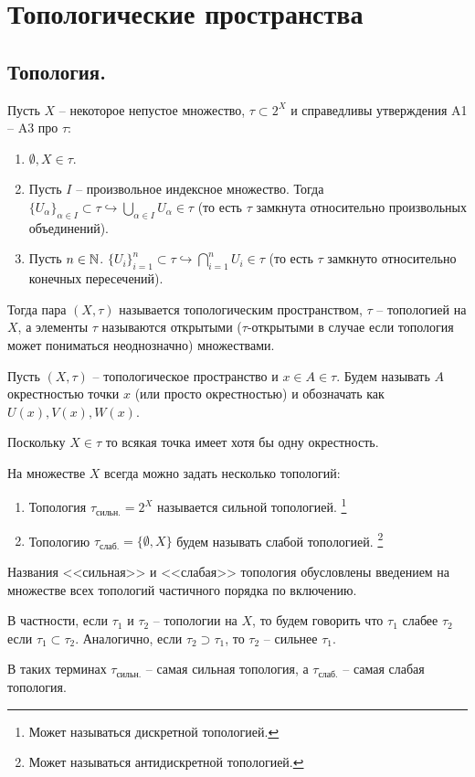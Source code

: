 \chapter{Топологические пространства}
\section{Топология.}
\begin{definition}\label{def:1.1.1}
    Пусть $X$ -- некоторое непустое множество, $\tau \subset 2^X$ и справедливы утверждения A1 -- A3 про $\tau\colon$
    \begin{enumerate}
        \item[A1] $\emptyset, X \in \tau$.
        \item[A2] Пусть $I$ -- произвольное индексное множество.
        Тогда $\{U_\alpha\}_{\alpha \in I} \subset \tau \hookrightarrow
        \bigcup_{\alpha \in I} U_\alpha \in \tau$ (то есть $\tau$ замкнута относительно произвольных объединений).
        \item[A3] Пусть $n \in \mathbb{N}$. $\{U_i\}_{i = 1}^n \subset \tau \hookrightarrow \bigcap_{i = 1}^n U_i \in \tau$ (то есть $\tau$ замкнуто относительно конечных пересечений).
    \end{enumerate}
    Тогда пара $(X, \tau)$ называется топологическим пространством, $\tau$ -- топологией на $X$, а элементы $\tau$ называются открытыми ($\tau$-открытыми в случае если топология может пониматься неоднозначно) множествами.
\end{definition}
\begin{definition}
     Пусть $(X, \tau)$ -- топологическое пространство и $x \in A \in \tau$.
     Будем называть $A$ окрестностью точки $x$ (или просто окрестностью) и обозначать как $U(x), V(x), W(x)$.
\end{definition}
\begin{note}
    Поскольку $X \in \tau$ то всякая точка имеет хотя бы одну окрестность.
\end{note}
\begin{examples}
    На множестве $X$ всегда можно задать несколько топологий:
    \begin{enumerate}
        \item Топология $\tau_{\text{сильн.}} = 2^X$ называется сильной топологией. \footnote{Может называться дискретной топологией.}
        \item Топологию $\tau_{\text{слаб.}} =\{\emptyset, X\}$ будем называть слабой топологией. \footnote{Может называться антидискретной топологией.}
    \end{enumerate}
    Названия <<сильная>> и <<слабая>> топология обусловлены введением на множестве всех топологий частичного порядка по включению.
    \begin{definition}
        В частности, если $\tau_1$ и $\tau_2$ -- топологии на $X$, то будем говорить что $\tau_1$ слабее $\tau_2$ если $\tau_1 \subset \tau_2$.
        Аналогично, если $\tau_2 \supset \tau_1$, то $\tau_2$ -- сильнее $\tau_1$.
    \end{definition}
    В таких терминах $\tau_{\text{сильн.}}$ -- самая сильная топология, а $\tau_{\text{слаб.}}$ -- самая слабая топология.
\end{examples}
